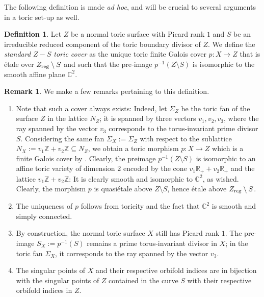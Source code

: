\documentclass{amsart}
\newcommand{\zz}{\mathbb{Z}}
\newcommand{\rr}{\mathbb{R}}
\newcommand{\cc}{\mathbb{C}}
\theoremstyle{definition}
\newtheorem{definition}[theorem]{Definition}
\newtheorem{remark}[theorem]{Remark}
\theoremstyle{remark}
\numberwithin{equation}{section}
\begin{document}
The following definition is made {\it ad hoc}, and will be crucial to several arguments in a toric set-up as well.

\begin{definition}
    Let $Z$ be a normal toric surface with Picard rank $1$ and $S$ be an irreducible reduced component of the toric boundary divisor of $Z$. 
    We define the {\it standard $Z- S$ toric cover} as the unique toric finite Galois cover $p:X\to Z$ that is étale over $Z_{\rm reg}\setminus S$ and such that the pre-image
    $p^{-1}(Z\setminus S)$ is isomorphic to the smooth affine plane $\cc^2$.
\end{definition}

\begin{remark}\label{rem:standardtoric} We make a few remarks pertaining to this definition.
\begin{enumerate}
    \item Note that such a cover always exists: Indeed, let $\Sigma_Z$ be the toric fan of the surface $Z$ in the lattice $N_Z$; it is spanned by three vectors $v_1,v_2,v_3$, where the ray spanned by the vector $v_3$ corresponds to the torus-invariant prime divisor $S$. Considering the same fan $\Sigma_X := \Sigma_Z$ with respect to the sublattice $N_X := v_1\zz+v_2\zz\subseteq N_Z$, we obtain a toric morphism $p:X\to Z$ which is a finite Galois cover by \cite[Example 5.0.13]{CLS11}.    
    Clearly, the preimage $p^{-1}(Z\setminus S)$ is isomorphic to an affine toric variety of dimension $2$ encoded by the cone $v_1\rr_{+} +v_2\rr_{+}$ and the lattice $v_1\zz+v_2\zz$: It is clearly smooth and isomorphic to $\cc^2$, as wished. Clearly, the morphism $p$ is quasiétale above $Z\setminus S$, hence étale above $Z_{\rm reg}\setminus S$.
    \item The uniqueness of $p$ follows from toricity and the fact that $\cc^2$ is smooth and simply connected.
    \item By construction, the normal toric surface $X$ still has Picard rank $1$. The pre-image $S_X:= p^{-1}(S)$ remains a prime torus-invariant divisor in $X$; in the toric fan $\Sigma_X$, it corresponds to the ray spanned by the vector $v_3$.
    \item The singular points of $X$ and their respective orbifold indices are in bijection with the singular points of $Z$ contained in the curve $S$ with their respective orbifold indices in $Z$.
\end{enumerate}
    
\end{remark}
\end{document}

